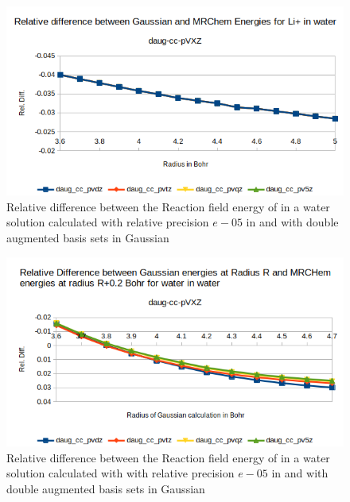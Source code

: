 \documentclass[../master_thesis.tex]{subfiles}
\begin{document}
\begin{figure}[!htb]
  \centering
  \includegraphics[width=\linewidth]{img/lipdaugreldiff.png}
  \caption[Relative difference of  against Gaussian double augmented results]{Relative difference between the Reaction field energy of  in a water solution calculated with relative precision $e-05$ in \mrchem
  and with double augmented basis sets in Gaussian}
  \label{fig:lipreldiffdaug}
\end{figure}



\begin{figure}[!htb]
  \centering
    \includegraphics[width=\linewidth]{img/watdaugreldiff02.png}
  \caption[Relative difference of shifted radius  against Gaussian double augmented results]{Relative difference between the Reaction field energy of  in a water solution calculated with with relative precision $e-05$ in \mrchem
  and with double augmented basis sets in Gaussian}
  \label{fig:watreldiff02daug}
\end{figure}
\end{document}
